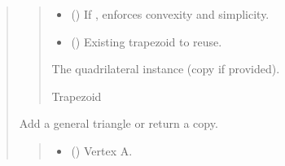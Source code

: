 \documentclass[letterpaper,10pt,english]{sphinxmanual}
\begin{document}
\begin{quote}
\begin{fulllineitems}
\begin{fulllineitems}
\begin{quote}
\begin{description}
\begin{itemize}
\item {} 
\sphinxAtStartPar
{} () \textendash{} If , enforces convexity and simplicity.

\item {} 
\sphinxAtStartPar
{} (\sphinxstyleliteralemphasis{\sphinxupquote{ | }}) \textendash{} Existing trapezoid to reuse.

\end{itemize}

\sphinxAtStartPar
The quadrilateral instance (copy if provided).

\sphinxAtStartPar
Trapezoid

\end{description}\end{quote}

\end{fulllineitems}


\begin{fulllineitems}
\label{\detokenize{pygeox:pygeox.add_objects.AddNamespace.triangle}}
\pysigstartsignatures
\pysiglinewithargsret
{}
{\sphinxparamcomma {}\sphinxparamcomma {}\sphinxparamcomma {}\sphinxparamcomma {}}
{}
\pysigstopsignatures
\sphinxAtStartPar
Add a general triangle or return a copy.
\begin{quote}\begin{description}
\begin{itemize}
\item {} 
\sphinxAtStartPar
{} (\sphinxstyleliteralemphasis{\sphinxupquote{ | }}) \textendash{} Vertex A.


\end{itemize}
\end{description}
\end{quote}
\end{fulllineitems}
\end{fulllineitems}
\end{quote}
\end{document}
